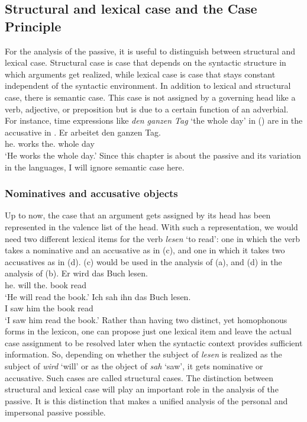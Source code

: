 \subsection{Structural and lexical case and the Case Principle}
\label{sec-struk-lex-kas}
\label{sec-struc-lex-kas}

For the analysis of the passive, it is useful to distinguish between structural and lexical
case. Structural case is case that depends on the syntactic structure in which arguments get
realized, while lexical case is case that stays constant independent of the syntactic environment. In
addition to lexical and structural case, there is semantic case. This case is not assigned by a
governing head like a verb, adjective, or preposition but is due to a certain function of an
adverbial. For instance, time expressions like \emph{den ganzen Tag} `the whole day' in () are
in the accusative in .
\ea
\gll Er arbeitet den ganzen Tag.\\
     he.\NOM{} works the.\ACC{} whole day\\\german
\glt `He works the whole day.'
\z
Since this chapter is about the passive and its variation in the  languages, I will ignore
semantic case here.

\subsubsection{Nominatives and accusative objects}

Up to now, the case that an argument gets assigned by its head has been represented in the valence list of
the head. With such a representation, we would need two different lexical items for the verb
\emph{lesen} `to read': one in which the verb takes a nominative and an accusative as in
(c), and one in which it takes two accusatives as in (d). (c) would be used in
the analysis of (a), and (d) in the analysis of (b).
\eal
\ex 
\gll Er        wird das        Buch lesen.\\
     he.\NOM{} will the.\ACC{} book read\\\german
\glt `He will read the book.'
\ex 
\gll Ich sah ihn das Buch lesen.\\
     I   saw him the book read\\
\glt `I saw him read the book.'
\ex {}
\ex {}
\zl
Rather than having two distinct, yet homophonous forms in the lexicon, one can propose just one lexical item and leave the actual
case assignment to be resolved later when the syntactic context provides sufficient information. So,
depending on whether the subject of \emph{lesen} is realized as the 
subject of \emph{wird} `will' or as the object of \emph{sah} `saw', it gets nominative or accusative. Such
cases are called structural cases. The distinction between structural and lexical case will play an
important role in the analysis of the passive. It is this distinction that makes a unified analysis of
the personal and impersonal passive possible.

